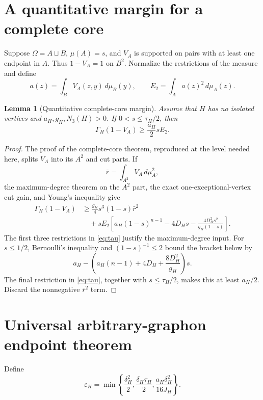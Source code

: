 \documentclass[11pt]{article}
\newtheorem{lemma}{Lemma}
\newcommand{\dd}{\,d}
\newcommand{\GammaH}{\Gamma_H}
\begin{document}
\section{A quantitative margin for a complete core}

Suppose $\Omega=A\sqcup B$, $\mu(A)=s$, and $V_A$ is supported on pairs with
at least one endpoint in $A$.  Thus $1-V_A=1$ on $B^2$.  Normalize the
restrictions of the measure and define
\[
 a(z)=\int_BV_A(z,y)\dd\mu_B(y),
 \qquad
 E_2=\int_Aa(z)^2\dd\mu_A(z).
\]

\begin{lemma}[Quantitative complete-core margin]
\label{lem:hub-margin}
Assume that $H$ has no isolated vertices and $a_H,g_H,N_3(H)>0$.
If $0<s\leq\tau_H/2$, then
\begin{equation}
 \GammaH(1-V_A)\geq\frac{a_H}{2}sE_2.
 \label{eq:hub-margin}
\end{equation}
\end{lemma}

\begin{proof}
The proof of the complete-core theorem, reproduced at the level needed here,
splits $V_A$ into its $A^2$ and cut parts.  If
\[
 \bar r=\int_{A^2}V_A\dd\mu_A^2,
\]
the maximum-degree theorem on the $A^2$ part, the exact
one-exceptional-vertex cut gain, and Young's inequality give
\begin{align*}
 \GammaH(1-V_A)
 &\geq \frac{g_H}{4}s^3(1-s)\bar r^2\\
 &\quad+sE_2\left[
 a_H(1-s)^{n-1}-4D_Hs
 -\frac{4D_H^2s^2}{g_H(1-s)}
 \right].
\end{align*}
The first three restrictions in \eqref{eq:tau} justify the maximum-degree
input.  For $s\leq1/2$, Bernoulli's inequality and
$(1-s)^{-1}\leq2$ bound the bracket below by
\[
 a_H-\left(a_H(n-1)+4D_H+\frac{8D_H^2}{g_H}\right)s.
\]
The final restriction in \eqref{eq:tau}, together with
$s\leq\tau_H/2$, makes this at least $a_H/2$.  Discard the nonnegative
$\bar r^2$ term.
\end{proof}

\section{Universal arbitrary-graphon endpoint theorem}

Define
\begin{equation}
 \varepsilon_H=\min\left\{
 \frac{\delta_H^2}{2},
 \frac{\delta_H\tau_H}{2},
 \frac{a_H\delta_H^2}{16J_H}
 \right\}.
 \label{eq:epsilon}
\end{equation}
\end{document}
